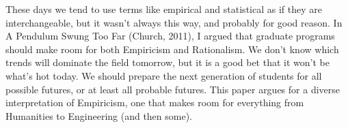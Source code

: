 These days we tend to use terms like empirical and statistical as if they are interchangeable, but it wasn't always this way, and probably for good reason. In A Pendulum Swung Too Far (Church, 2011), I argued that graduate programs should make room for both Empiricism and Rationalism.  We don't know which trends will dominate the field tomorrow, but it is a good bet that it won't be what's hot today. We should prepare the next generation of students for all possible futures, or at least all probable futures.  This paper argues for a diverse interpretation of Empiricism, one that makes room for everything from Humanities to Engineering (and then some).
